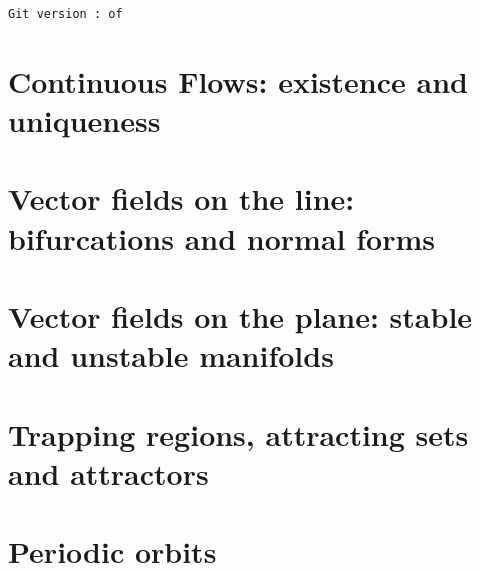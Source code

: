 \documentclass[fleqn]{mc}
\begin{document}
\tableofcontents
\texttt{Git version \gitbranch:\gitrevision \ of \gitdate}

\section{Continuous Flows: existence and uniqueness}


\section{Vector fields on the line: bifurcations and normal forms}


\section{Vector fields on the plane: stable and unstable manifolds}

\section{Trapping regions,  attracting sets and attractors}


\section{Periodic orbits}



 
\end{document}
